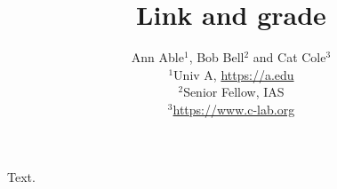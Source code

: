 \documentclass{article}
\title{Link and grade}
\author{Ann Able$^{1}$, Bob Bell$^{2}$ and Cat Cole$^{3}$\\
$^{1}$Univ A, \url{https://a.edu}\\
$^{2}$Senior Fellow, IAS\\
$^{3}$\url{https://www.c-lab.org}}
\begin{document}
\maketitle
Text.
\end{document}
